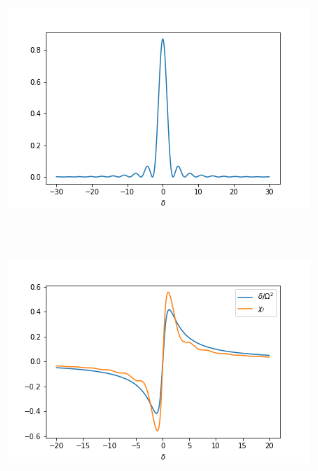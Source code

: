 \begin{ex}
    \label{ex7.19}
    \
    \begin{figure}[H]
        \begin{center}
            \includegraphics[width = 80mm]{../fig/ex7_19.png}
        \end{center}
    \end{figure}
\end{ex}

\begin{ex}
    \label{ex7.20}
    \
    \begin{figure}[H]
        \begin{center}
            \includegraphics[width = 80mm]{../fig/ex7_20.png}
        \end{center}
    \end{figure}
\end{ex}

